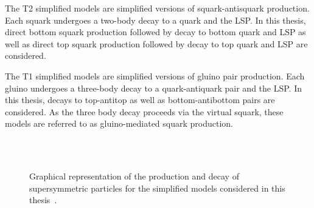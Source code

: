 The T2 simplified models are simplified versions of squark-antisquark production. Each squark undergoes
a two-body decay to a quark and the LSP. In this thesis, direct bottom squark production followed
by decay to bottom quark and LSP as well as direct top squark production followed by decay to top
quark and LSP are considered.

The T1 simplified models are simplified versions of gluino pair production. Each gluino undergoes a three-body 
decay to a quark-antiquark pair and the LSP. In this thesis, decays to top-antitop as well as bottom-antibottom
pairs are considered. As the three body decay proceeds via the virtual squark, these models 
are referred to as gluino-mediated squark production.

\begin{figure}[h!]
  \begin{center}
     ~~
     \\
     ~~
    \caption{
      Graphical representation of the production and decay of supersymmetric particles 
      for the simplified models considered in this thesis~\cite{SMS}.
    }
    \label{fig:simplified-models-feyn}
  \end{center}
\end{figure}

